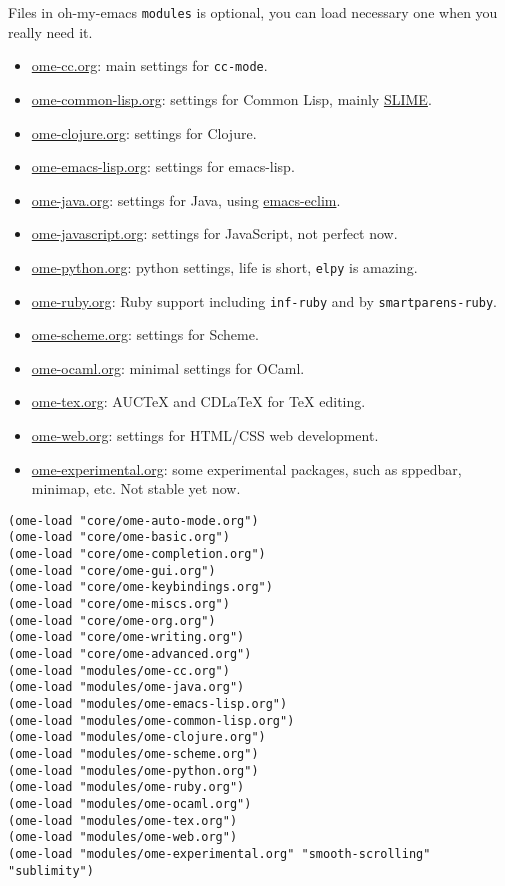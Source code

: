 \documentclass[11pt]{article}
\begin{document}
Files in oh-my-emacs \texttt{modules} is optional, you can load necessary one when
you really need it.
\begin{itemize}
\item \href{modules/ome-cc.org}{ome-cc.org}: main settings for \texttt{cc-mode}.
\item \href{modules/ome-common-lisp.org}{ome-common-lisp.org}: settings for Common Lisp, mainly \href{http://common-lisp.net/project/slime/}{SLIME}.
\item \href{modules/ome-clojure.org}{ome-clojure.org}: settings for Clojure.
\item \href{modules/ome-emacs-lisp.org}{ome-emacs-lisp.org}: settings for emacs-lisp.
\item \href{modules/ome-java.org}{ome-java.org}: settings for Java, using \href{https://github.com/senny/emacs-eclim}{emacs-eclim}.
\item \href{modules/ome-javascript.org}{ome-javascript.org}: settings for JavaScript, not perfect now.
\item \href{modules/ome-python.org}{ome-python.org}: python settings, life is short, \texttt{elpy} is amazing.
\item \href{modules/ome-ruby.org}{ome-ruby.org}: Ruby support including \texttt{inf-ruby} and by \texttt{smartparens-ruby}.
\item \href{modules/ome-scheme.org}{ome-scheme.org}: settings for Scheme.
\item \href{modules/ome-ocaml.org}{ome-ocaml.org}: minimal settings for OCaml.
\item \href{modules/ome-tex.org}{ome-tex.org}: AUCTeX and CDLaTeX for \TeX{} editing.
\item \href{modules/ome-web.org}{ome-web.org}: settings for HTML/CSS web development.
\item \href{modules/ome-experimental.org}{ome-experimental.org}: some experimental packages, such as sppedbar, minimap,
etc. Not stable yet now.
\end{itemize}

\begin{verbatim}
(ome-load "core/ome-auto-mode.org")
(ome-load "core/ome-basic.org")
(ome-load "core/ome-completion.org")
(ome-load "core/ome-gui.org")
(ome-load "core/ome-keybindings.org")
(ome-load "core/ome-miscs.org")
(ome-load "core/ome-org.org")
(ome-load "core/ome-writing.org")
(ome-load "core/ome-advanced.org")
(ome-load "modules/ome-cc.org")
(ome-load "modules/ome-java.org")
(ome-load "modules/ome-emacs-lisp.org")
(ome-load "modules/ome-common-lisp.org")
(ome-load "modules/ome-clojure.org")
(ome-load "modules/ome-scheme.org")
(ome-load "modules/ome-python.org")
(ome-load "modules/ome-ruby.org")
(ome-load "modules/ome-ocaml.org")
(ome-load "modules/ome-tex.org")
(ome-load "modules/ome-web.org")
(ome-load "modules/ome-experimental.org" "smooth-scrolling" "sublimity")
\end{verbatim}
\end{document}
